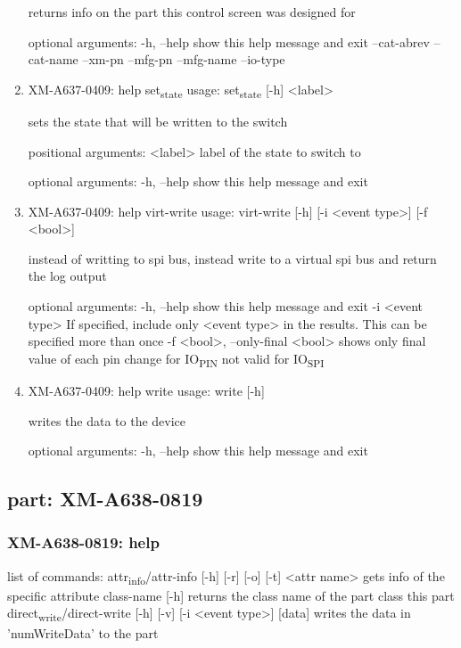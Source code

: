 \documentclass[11pt]{article}
\begin{document}
\begin{enumerate}
returns info on the part this control screen was designed for

optional arguments:
  -h, --help   show this help message and exit
  --cat-abrev
  --cat-name
  --xm-pn
  --mfg-pn
  --mfg-name
  --io-type

\item XM-A637-0409: help set\textsubscript{state}
\label{sec:org2317280}
usage: set\textsubscript{state} [-h] <label>

sets the state that will be written to the switch

positional arguments:
  <label>     label of the state to switch to

optional arguments:
  -h, --help  show this help message and exit

\item XM-A637-0409: help virt-write
\label{sec:org72c0a67}
usage: virt-write [-h] [-i <event type>] [-f <bool>]

instead of writting to spi bus, instead write to a virtual spi bus and return
the log output

optional arguments:
  -h, --help            show this help message and exit
  -i <event type>       If specified, include only <event type> in the
                        results. This can be specified more than once
  -f <bool>, --only-final <bool>
                        shows only final value of each pin change for IO\textsubscript{PIN}
                        not valid for IO\textsubscript{SPI}

\item XM-A637-0409: help write
\label{sec:orga9454ff}
usage: write [-h]

writes the data to the device

optional arguments:
  -h, --help  show this help message and exit
\end{enumerate}

\subsection{part: XM-A638-0819}
\label{sec:orgdee43f7}
\subsubsection{XM-A638-0819: help}
\label{sec:orgceb7694}
list of commands:
  attr\textsubscript{info}/attr-info [-h] [-r] [-o] [-t] <attr name>
    gets info of the specific attribute
  class-name [-h]
    returns the class name of the part class this part
  direct\textsubscript{write}/direct-write [-h] [-v] [-i <event type>] [data]
    writes the data in 'numWriteData' to the part
\end{document}
